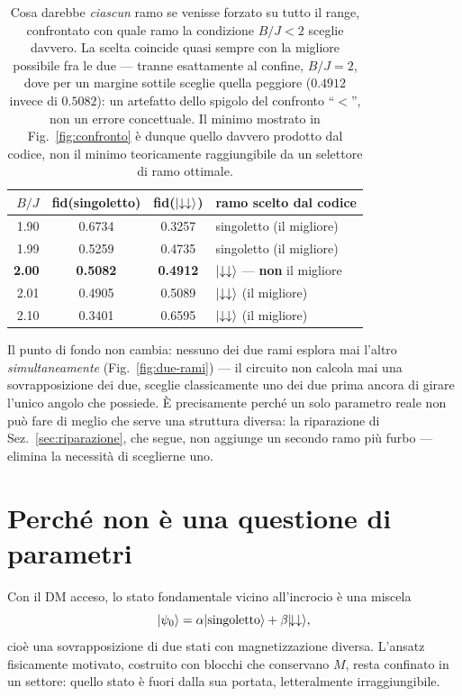 \documentclass[11pt,a4paper]{article}
\begin{document}
\begin{table}[htbp]
\centering
\small
\renewcommand{\arraystretch}{1.25}
\begin{tabular}{@{}rccl@{}}
\toprule
\rowcolor{grigetto}
$B/J$ & fid(singoletto) & fid($\lvert \downarrow\downarrow\rangle$) & ramo scelto dal codice \\
\midrule
1.90 & 0.6734 & 0.3257 & singoletto (il migliore) \\
1.99 & 0.5259 & 0.4735 & singoletto (il migliore) \\
\textbf{2.00} & \textbf{0.5082} & \textbf{0.4912} & $\lvert \downarrow\downarrow\rangle$ --- \textbf{non} il migliore \\
2.01 & 0.4905 & 0.5089 & $\lvert \downarrow\downarrow\rangle$ (il migliore) \\
2.10 & 0.3401 & 0.6595 & $\lvert \downarrow\downarrow\rangle$ (il migliore) \\
\bottomrule
\end{tabular}
\caption{Cosa darebbe \emph{ciascun} ramo se venisse forzato su tutto il
range, confrontato con quale ramo la condizione $B/J<2$ sceglie davvero. La
scelta coincide quasi sempre con la migliore possibile fra le due --- tranne
esattamente al confine, $B/J=2$, dove per un margine sottile sceglie quella
peggiore ($0.4912$ invece di $0.5082$): un artefatto dello spigolo del
confronto ``$<$'', non un errore concettuale. Il minimo mostrato in
Fig.~\ref{fig:confronto} è dunque quello davvero prodotto dal codice, non il
minimo teoricamente raggiungibile da un selettore di ramo ottimale.}
\label{tab:doppio-ramo}
\end{table}

\FloatBarrier

Il punto di fondo non cambia: nessuno dei due rami esplora mai l'altro
\emph{simultaneamente} (Fig.~\ref{fig:due-rami}) --- il circuito non calcola
mai una sovrapposizione dei due, sceglie classicamente uno dei due prima
ancora di girare l'unico angolo che possiede. È precisamente perché un solo
parametro reale non può fare di meglio che serve una struttura diversa: la
riparazione di Sez.~\ref{sec:riparazione}, che segue, non aggiunge un secondo
ramo più furbo --- elimina la necessità di sceglierne uno.

\section{Perché non è una questione di parametri}

Con il DM acceso, lo stato fondamentale vicino all'incrocio è una miscela
\begin{equation}
\lvert \psi_0\rangle = \alpha\lvert \text{singoletto}\rangle + \beta\lvert \!\downarrow\downarrow\rangle,
\end{equation}
cioè una sovrapposizione di due stati con magnetizzazione diversa. L'ansatz
fisicamente motivato, costruito con blocchi che conservano $M$, resta confinato
in un settore: quello stato è fuori dalla sua portata, letteralmente
irraggiungibile.
\end{document}
